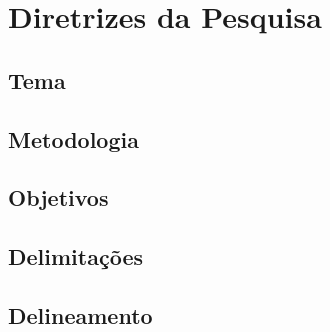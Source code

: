 \chapter{Diretrizes da Pesquisa}



\section{Tema}


\section{Metodologia}

\section{Objetivos}

\section{Delimitações}

\section{Delineamento}

